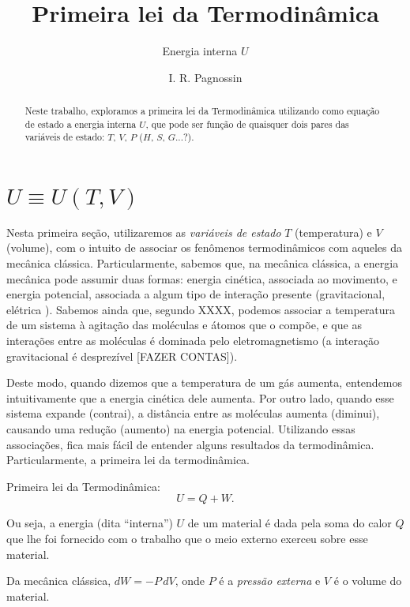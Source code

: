 \documentclass[a4paper,12pt]{scrartcl}
\title{Primeira lei da Termodinâmica}
\subtitle{Energia interna $U$}
\author{I. R. Pagnossin}
\begin{document}
\maketitle

\begin{abstract}
  Neste trabalho, exploramos a primeira lei da Termodinâmica utilizando como equação de estado a energia interna $U$, que pode ser função de quaisquer dois pares das variáveis de estado: $T$, $V$, $P$ ($H$, $S$, $G$...?).
\end{abstract}

\newcommand\D[3]{\ensuremath{\left(\frac{\partial #1}{\partial #2}\right)_{#3}}}

\section{$U \equiv U(T,V)$}

  Nesta primeira seção, utilizaremos as \emph{variáveis de estado} $T$ (temperatura) e $V$ (volume), com o intuito de associar os fenômenos termodinâmicos com aqueles da mecânica clássica.
  Particularmente, sabemos que, na mecânica clássica, a energia mecânica pode assumir duas formas: energia cinética, associada ao movimento, e energia potencial, associada a algum tipo de interação presente (gravitacional, elétrica \etc).
  Sabemos ainda que, segundo XXXX, podemos associar a temperatura de um sistema à agitação das moléculas e átomos que o compõe, e que as interações entre as moléculas é dominada pelo eletromagnetismo (a interação gravitacional é desprezível [FAZER CONTAS]).
  
  Deste modo, quando dizemos que a temperatura de um gás aumenta, entendemos intuitivamente que a energia cinética dele aumenta.
  Por outro lado, quando esse sistema expande (contrai), a distância entre as moléculas aumenta (diminui), causando uma redução (aumento) na energia potencial.
  Utilizando essas associações, fica mais fácil de entender alguns resultados da termodinâmica. Particularmente, a primeira lei da termodinâmica.
  

  Primeira lei da Termodinâmica:
  \begin{equation}\label{eq:1st-law}
  U = Q + W. 
  \end{equation}

  Ou seja, a energia (dita ``interna'') $U$ de um material é dada pela soma do calor $Q$ que lhe foi fornecido com o trabalho que o meio externo exerceu sobre esse material.
  
  Da mecânica clássica, $dW = -P\, dV$, onde $P$ é a \emph{pressão externa} e $V$ é o volume do material.
  
\end{document}
